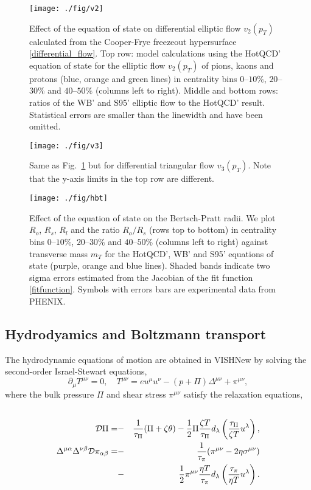 \documentclass[aps,prc,reprint,amsmath,nofootinbib,superscriptaddress]{revtex4-1}
\begin{document}
\begin{figure*}[t]
  \texttt{[image: ./fig/v2]}
  \caption{
    \label{fig:v2} Effect of the equation of state on differential elliptic flow $v_2(p_T)$ calculated from the Cooper-Frye freezeout hypersurface \eqref{differential_flow}.
    Top row: model calculations using the HotQCD' equation of state for the elliptic flow $v_2(p_T)$  of pions, kaons and protons (blue, orange and green lines) 
    in centrality bins $0$--$10\%$, $20$--$30\%$ and $40$--$50\%$ (columns left to right). Middle and bottom rows: ratios of the WB' and S95' elliptic flow to 
    the HotQCD' result. Statistical errors are smaller than the linewidth and have been omitted.
  }
\end{figure*}

\begin{figure*}[t]
  \texttt{[image: ./fig/v3]}
  \caption{
    \label{fig:v3} Same as Fig.~\ref{fig:v2} but for differential triangular flow $v_3(p_T)$. Note that the y-axis limits in the top row are different.
  }
\end{figure*}

\begin{figure*}[t]
  \texttt{[image: ./fig/hbt]}
  \caption{
    \label{fig:hbt} Effect of the equation of state on the Bertsch-Pratt radii.  We plot $R_o$, $R_s$, $R_l$ and the ratio $R_o/R_s$ (rows top to bottom) 
    in centrality bins $0$--$10\%$, $20$--$30\%$ and $40$--$50\%$ (columns left to right) against transverse mass $m_T$ for the HotQCD', WB'  and S95' equations of state 
    (purple, orange and blue lines). Shaded bands indicate two sigma errors estimated from the Jacobian of the fit function \eqref{fitfunction}. Symbols with errors bars 
    are experimental data from PHENIX.  
  }
\end{figure*}

\subsection{Hydrodyamics and Boltzmann transport}

The hydrodynamic equations of motion are obtained in VISHNew by solving the second-order Israel-Stewart equations,
\begin{equation}
 \partial_\mu T^{\mu\nu} = 0, \quad T^{\mu\nu} = e u^\mu u^\nu - (p + \Pi) \Delta^{\mu\nu} + \pi^{\mu\nu},
\end{equation}
where the bulk pressure $\Pi$ and shear stress $\pi^{\mu\nu}$ satisfy the relaxation equations,
\begin{eqnarray}
 \label{viscosity}
 \cr \mathcal{D}\Pi = &-&\frac{1}{\tau_\Pi}(\Pi + \zeta \theta) - \frac{1}{2} \Pi \frac{\zeta T}{\tau_\Pi}d_\lambda \left(\frac{\tau_\Pi}{\zeta T} u^\lambda \right), \nonumber \\
  \Delta^{\mu\alpha} \Delta^{\nu\beta} \mathcal{D}\pi_{\alpha\beta} = &-&\frac{1}{\tau_\pi}(\pi^{\mu\nu} - 2 \eta \sigma^{\mu\nu}) \\
  &-& \frac{1}{2} \pi^{\mu\nu} \frac{\eta T}{\tau_\pi} d_\lambda\left(\frac{\tau_\pi}{\eta T} u^\lambda \right ).
\end{eqnarray}
\end{document}

